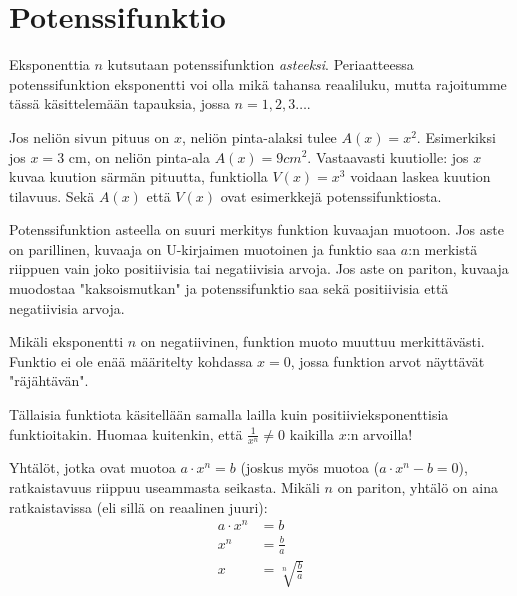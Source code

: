 \chapter{Potenssifunktio}


Eksponenttia $n$ kutsutaan potenssifunktion \emph{asteeksi}. Periaatteessa
potenssifunktion eksponentti voi olla mikä tahansa reaaliluku, mutta
rajoitumme tässä käsittelemään tapauksia, jossa $n = 1, 2, 3\ldots $.

\begin{esimerkki}
Jos neliön sivun pituus on $x$, neliön pinta-alaksi tulee $A(x)=x^2$.
Esimerkiksi jos $x = 3$ cm, on neliön pinta-ala $A(x) = 9 cm^2$.
Vastaavasti kuutiolle: jos $x$ kuvaa kuution särmän pituutta, funktiolla
$V(x)=x^3$ voidaan laskea kuution tilavuus. Sekä $A(x)$ että $V(x)$ ovat
esimerkkejä potenssifunktiosta.
\end{esimerkki}

Potenssifunktion asteella on suuri merkitys funktion kuvaajan muotoon.
Jos aste on parillinen, kuvaaja on U-kirjaimen muotoinen ja funktio
saa $a$:n merkistä riippuen vain joko positiivisia tai negatiivisia arvoja.
Jos aste on pariton, kuvaaja muodostaa "kaksoismutkan" ja potenssifunktio
saa sekä positiivisia että negatiivisia arvoja.


Mikäli eksponentti $n$ on negatiivinen, funktion muoto muuttuu merkittävästi. Funktio ei ole enää määritelty kohdassa $x=0$, jossa funktion arvot näyttävät "räjähtävän".

Tällaisia funktiota käsitellään samalla lailla kuin positiivieksponenttisia funktioitakin. Huomaa kuitenkin, että $\frac{1}{x^n} \neq 0 $ kaikilla $x$:n arvoilla!  




Yhtälöt, jotka ovat muotoa $a\cdot x^n = b$ (joskus myös muotoa  ($a\cdot x^n - b = 0$), ratkaistavuus riippuu useammasta seikasta. Mikäli $n$ on pariton, yhtälö on aina ratkaistavissa (eli sillä on reaalinen juuri):
\begin{align*}
a\cdot x^n &= b \\
x^n &= \frac{b}{a} \\
x &= \sqrt[n]{\frac{b}{a}}
\end{align*}

